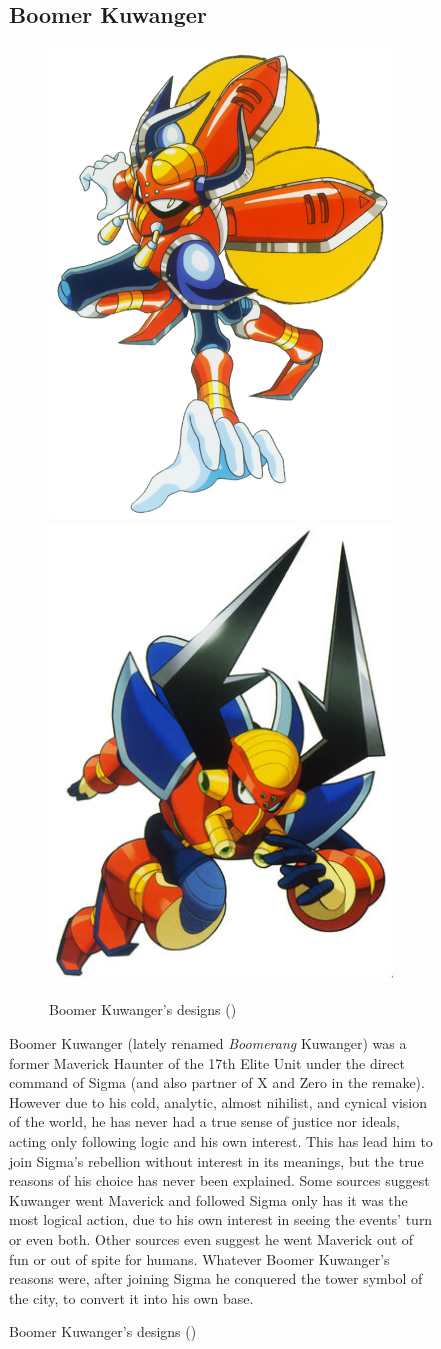 \begin{figure}[htp]
\subsection{Boomer Kuwanger}\label{boss:Boomer_Kuwanger}
\begin{figure}[htp]
	\centering
	\includegraphics[width=0.4\linewidth]{figures/X1/Boomer_kuwanger/Boomer_kuwanger.jpg}
	\includegraphics[width=0.4\linewidth]{figures/X1/Boomer_kuwanger/MHXBoomerKuwanger.jpg}
	\caption{Boomer Kuwanger's designs (\cite{book:MMX_Complete_art})}
\end{figure}
Boomer Kuwanger (lately renamed \emph{Boomerang} Kuwanger) was a former Maverick Haunter of the 17th Elite Unit under the direct command of Sigma (and also partner of X and Zero in the \mhx remake). However due to his cold, analytic, almost nihilist\cite{book:MH_field_guide}, and cynical vision of the world, he has never had a true sense of justice nor ideals, acting only following logic and his own interest\cite{MHX:manual}. This has lead him to join Sigma's rebellion without interest in its meanings, but the true reasons of his choice has never been explained. Some sources suggest Kuwanger went Maverick and followed Sigma only has it was the most logical action\cite{MHX:manual}, due to his own interest in seeing the events' turn\cite{wiki:Boomer_kuwanger} or even both\cite{book:MH_field_guide}. Other sources even suggest he went Maverick out of fun\cite{Xcoll1:Manual_X1} or out of spite for humans\cite{wayback:X_resources}. Whatever Boomer Kuwanger's reasons were, after joining Sigma he conquered the tower symbol of the city, to convert it into his own base.


\end{figure}
